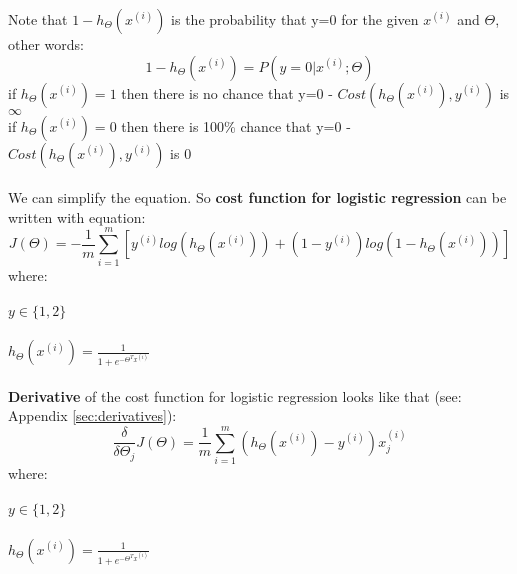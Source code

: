 \documentclass{article} %
\begin{document}
Note that $1-h_{\Theta}(x^{(i)})$ is the probability that y=0 for the given $x^{(i)}$ and $\Theta$, other words:
\begin{equation}
1-h_{\Theta}(x^{(i)}) = P( y=0 | x^{(i)};\Theta )
\end{equation}
if $h_{\Theta}(x^{(i)}) = 1$ then there is no chance that y=0 - $Cost(h_{\Theta}(x^{(i)}),y^{(i)})$ is $\infty$\\
if $h_{\Theta}(x^{(i)}) = 0$ then there is 100\% chance that y=0 - $Cost(h_{\Theta}(x^{(i)}),y^{(i)})$ is 0\\
\\
We can simplify the equation. So \textbf{cost function for logistic regression} can be written with equation:
\begin{equation}
J(\Theta) = - \frac{1}{m}\sum_{i=1}^{m}[y^{(i)}log(h_{\Theta}(x^{(i)}))+(1-y^{(i)})log(1-h_{\Theta}(x^{(i)}))] 
\end{equation}
where:\\
\\
$y\in\{1,2\}$ \\
\\
$h_\Theta(x^{(i)}) = \frac{1}{1+e^{-{\Theta^Tx^{(i)}}}}$\\
\\
\textbf{Derivative} of the cost function for logistic regression looks like that (see: Appendix \ref{sec:derivatives}):
\newline
\begin{equation}
\frac{\delta}{\delta\Theta_j}J(\Theta) = \frac{1}{m} \sum_{i=1}^m (h_\Theta(x^{(i)}) - y^{(i)}) x_j^{(i)}
\end{equation}
where:\\
\\
$y\in\{1,2\}$ \\
\\
$h_\Theta(x^{(i)}) = \frac{1}{1+e^{-{\Theta^Tx^{(i)}}}}$\\
\\
\end{document}
